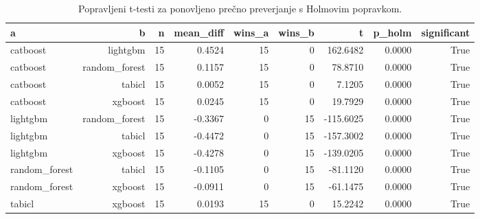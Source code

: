\begin{table}[htbp]
\centering
\caption{Popravljeni t-testi za ponovljeno prečno preverjanje s Holmovim popravkom.}
\label{tab:corrected-ttest}
\begin{tabular}{lrrrrrrrr}
\hline
a & b & n & mean\_diff & wins\_a & wins\_b & t & p\_holm & significant \\
\hline
catboost & lightgbm & 15 & 0.4524 & 15 & 0 & 162.6482 & 0.0000 & True \\
catboost & random\_forest & 15 & 0.1157 & 15 & 0 & 78.8710 & 0.0000 & True \\
catboost & tabicl & 15 & 0.0052 & 15 & 0 & 7.1205 & 0.0000 & True \\
catboost & xgboost & 15 & 0.0245 & 15 & 0 & 19.7929 & 0.0000 & True \\
lightgbm & random\_forest & 15 & -0.3367 & 0 & 15 & -115.6025 & 0.0000 & True \\
lightgbm & tabicl & 15 & -0.4472 & 0 & 15 & -157.3002 & 0.0000 & True \\
lightgbm & xgboost & 15 & -0.4278 & 0 & 15 & -139.0205 & 0.0000 & True \\
random\_forest & tabicl & 15 & -0.1105 & 0 & 15 & -81.1120 & 0.0000 & True \\
random\_forest & xgboost & 15 & -0.0911 & 0 & 15 & -61.1475 & 0.0000 & True \\
tabicl & xgboost & 15 & 0.0193 & 15 & 0 & 15.2242 & 0.0000 & True \\
\hline
\end{tabular}
\end{table}
